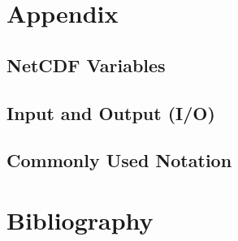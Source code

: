 %

%

\part{Appendix}
\label{ch:appendix}
\appendix
\renewcommand{\dir}{ug}
\chapter{NetCDF Variables}
\label{ch:appendix_vars}

%
%
%
\renewcommand{\dir}{ext}


%

\chapter{Input and Output (I/O)}
\label{ch:appendix_io}
\renewcommand{\dir}{dg}


\chapter{Commonly Used Notation}
\label{ch:notation}
\renewcommand{\dir}{appendix}


\part{Bibliography}


